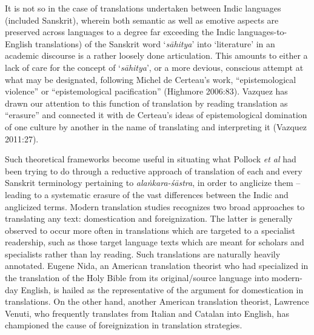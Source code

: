 It is not so in the case of translations undertaken between Indic languages (included Sanskrit), wherein both semantic as well as emotive aspects are preserved across languages to a degree far exceeding the Indic languages-to-English translations) of the Sanskrit word ‘\textsl{sāhitya}’ into ‘literature’ in an academic discourse is a rather loosely done articulation. This amounts to either a lack of care for the concept of ‘\textsl{sāhitya}’, or a more devious, conscious attempt at what may be designated, following Michel de Certeau’s work, “epistemological violence” or “epistemological pacification” (Highmore 2006:83). Vazquez has drawn our attention to this function of translation by reading translation as “erasure” and connected it with de Certeau’s ideas of epistemological domination of one culture by another in the name of translating and interpreting it (Vazquez 2011:27). 

Such theoretical frameworks become useful in situating what Pollock \textsl{et al} had been trying to do through a reductive approach of translation of each and every Sanskrit terminology pertaining to \textsl{alaṅkara-śāstra}, in order to anglicize them -- leading to a systematic erasure of the vast differences between the Indic and anglicized terms. Modern translation studies recognizes two broad approaches to translating any text: domestication and foreignization. The latter is generally observed to occur more often in translations which are targeted to a specialist readership, such as those target language texts which are meant for scholars and specialists rather than lay reading. Such translations are naturally heavily annotated. Eugene Nida, an American translation theorist who had specialized in the translation of the Holy Bible from its original/source language into modern-day English, is hailed as the representative of the argument for domestication in translations. On the other hand, another American translation theorist, Lawrence Venuti, who frequently translates from Italian and Catalan into English, has championed the cause of foreignization in translation strategies. 

\newpage

